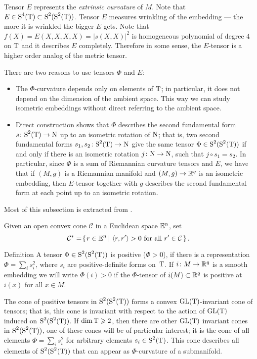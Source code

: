 \documentclass{article}
\begin{document}
Tensor $E$ represents the \emph{extrinsic curvature} of $M$.
Note that $E\in \S^4(\T)\z\i \S^2(\S^2(\T))$.
Tensor $E$ measures wrinkling of the embedding --- the more it is wrinkled the bigger $E$ gets.
Note that
$f(X)=E(X,X,X,X)=|s(X,X)|^2$
is homogeneous polynomial of degree $4$ on $\text{\rm T}$ 
and it describes $E$ completely.
Therefore in some sense, the $E$-tensor is a higher order analog of the metric tensor.

There are two reasons to use tensors $\Phi$ and $E$: 
\begin{itemize}
\item The $\Phi$-curvature depends only on elements of $\text{\rm T}$;
in particular, it does not depend on the dimension of the ambient space.
This way we can study isometric embeddings without direct referring to the ambient space.
\item Direct
construction shows that $\Phi$ describes the second fundamental
form $s\colon\text{\rm S}^2(\text{\rm T})\to \text{\rm N}$
up to an isometric rotation of $\text{\rm N}$;
that is, two second
fundamental forms $s_1,s_2\colon\text{\rm S}^2(\text{\rm T})\to \text{\rm N}$ 
give the same tensor $\Phi\in\text{\rm S}^2(\text{\rm S}^2(\text{\rm T}))$ if and only if there is an isometric rotation
$j\colon\text{\rm N}\to \text{\rm N}$, such that $j\circ s_1=s_2$. 
In particular, since
$\Phi$ is a sum of Riemannian curvature tensors and $E$, we have
that if $(M,g)$ is a Riemannian manifold and $(M,g)\to \mathbb{R}^q$ is
an isometric embedding, then $E$-tensor together with $g$ describes
the second fundamental form at each point up to an isometric
rotation.
\end{itemize}

Most of this subsection is extracted from \cite[2.4.9B(4)]{Grom-PDR}.

Given an open convex cone $\mathcal{C}$
in a Euclidean space $\mathbb{E}^n$, set
$$\mathcal{C}^*=\set{r\in \EE^n}{\langle r,r'\rangle >0 \text{ for all }r'\in \mathcal{C}}.$$

\begin{thm}{Definition} A tensor $\Phi\in \text{\rm S}^2(\text{\rm S}^2(\text{\rm T}))$
is positive ($\Phi> 0$), if there is a
representation $\Phi=\sum_i s_i^2$, where $s_i$ are positive-definite forms on~$\text{\rm T}$.
If $i\colon M\to \mathbb{R}^q$ is a smooth embedding we will write
$\Phi(i)>0$ if the $\Phi$-tensor of $i(M)\subset \mathbb{R}^q$ is positive
at $i(x)$ for all $x\in M$.
\end{thm}


The cone of positive tensors in $\text{\rm S}^2(\text{\rm S}^2(\text{\rm T}))$ forms a convex
$\mathrm{GL}(\text{\rm T})$-invariant cone of tensors;
that is, this cone is invariant with respect to the action of $\mathrm{GL}(\text{\rm T})$ induced on $\text{\rm S}^2(\text{\rm S}^2(\text{\rm T}))$.
If $\mathop{\rm dim}\nolimits \text{\rm T}\geqslant 2$, then
there are other $\mathrm{GL}(\text{\rm T})$ invariant cones in $\text{\rm S}^2(\text{\rm S}^2(\text{\rm T}))$, one of
these cones will be of particular interest; it is the cone
of all elements $\Phi=\sum_i s_i^2$ for arbitrary elements $s_i\in
\text{\rm S}^2(\text{\rm T})$. This cone describes all elements of $\text{\rm S}^2(\text{\rm S}^2(\text{\rm T}))$ that
can appear as $\Phi$-curvature of a submanifold.
\end{document}
